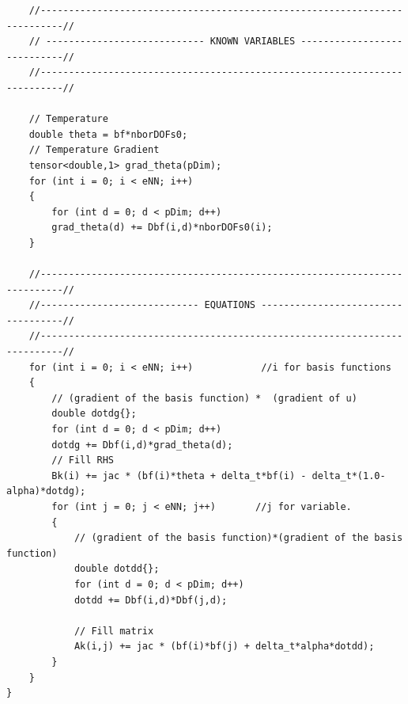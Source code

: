\documentclass[]{article}
\begin{document}
\begin{lstlisting}
	//--------------------------------------------------------------------------//
	// ---------------------------- KNOWN VARIABLES ----------------------------//
	//--------------------------------------------------------------------------//
	
	// Temperature
	double theta = bf*nborDOFs0;
	// Temperature Gradient
	tensor<double,1> grad_theta(pDim);
	for (int i = 0; i < eNN; i++)
	{
		for (int d = 0; d < pDim; d++)
		grad_theta(d) += Dbf(i,d)*nborDOFs0(i); 
	}
	
	//--------------------------------------------------------------------------//
	//---------------------------- EQUATIONS -----------------------------------//
	//--------------------------------------------------------------------------// 
	for (int i = 0; i < eNN; i++)            //i for basis functions
	{
		// (gradient of the basis function) *  (gradient of u)
		double dotdg{};
		for (int d = 0; d < pDim; d++)
		dotdg += Dbf(i,d)*grad_theta(d);
		// Fill RHS
		Bk(i) += jac * (bf(i)*theta + delta_t*bf(i) - delta_t*(1.0-alpha)*dotdg);
		for (int j = 0; j < eNN; j++)       //j for variable.
		{
			// (gradient of the basis function)*(gradient of the basis function)
			double dotdd{};
			for (int d = 0; d < pDim; d++)
			dotdd += Dbf(i,d)*Dbf(j,d);
			
			// Fill matrix
			Ak(i,j) += jac * (bf(i)*bf(j) + delta_t*alpha*dotdd);
		}
	}
}

\end{lstlisting}
\end{document}
